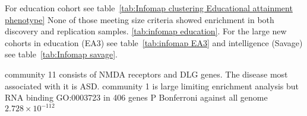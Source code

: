 For education cohort see table~\ref{tab:Infomap clustering Educational attainment phenotype} None of those meeting size criteria showed enrichment in both discovery and replication samples. \ref{tab:infomap education}. For the large new cohorts in education (EA3) see table~\ref{tab:infomap EA3} and intelligence (Savage) see table~\ref{tab:Infomap savage}.

community 11 consists of NMDA receptors and DLG genes. The disease most associated with it is ASD. community 1 is large limiting enrichment analysis but RNA binding GO:0003723 in 406 genes P Bonferroni against all genome $2.728 \times 10^{-112}$ 








